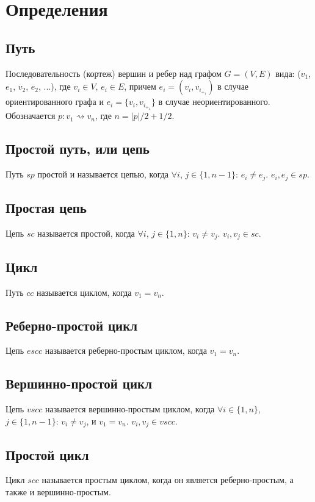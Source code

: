 \documentclass{article}
\begin{document}
\section {Определения}

\subsection{Путь}
Последовательность (кортеж) вершин и ребер над графом \(G = (V, E)\) вида: (\(v_1\), \(e_1\), \(v_2\), \(e_2\), ...), где \(v_i \in V\), \(e_i \in E\), причем \( e_i = (v_i, v_i_+_1)\) в случае ориентированного графа и \(e_i = \{v_i, v_i_+_1\}\) в случае неориентированного. Обозначается \(p: v_1 \rightsquigarrow v_n\), где \(n = |p|/2 + 1/2\).

\subsection{Простой путь, или цепь}
Путь \(sp\) простой и называется цепью, когда \(\forall i\), \(j  \in \{1, n - 1\}\): \(e_i \neq e_j\). \(e_i, e_j \in sp\).

\subsection{Простая цепь}
Цепь \(sc\) называется простой, когда \(\forall i\), \(j \in \{1, n\}\): \(v_i \neq v_j\). \(v_i, v_j \in sc\).

\subsection{Цикл}
Путь \(cc\) называется циклом, когда \(v_1 = v_n\).

\subsection{Реберно-простой цикл}
Цепь \(escc\) называется реберно-простым циклом, когда \(v_1 = v_n\).

\subsection{Вершинно-простой цикл}
Цепь \(vscc\) называется вершинно-простым циклом, когда \(\forall i \in \{1, n\}\), \(j \in \{1, n - 1\}\): \(v_i \neq v_j\), и \(v_1 = v_n\). \(v_i, v_j \in vscc\).

\subsection{Простой цикл}
Цикл \(scc\) называется простым циклом, когда он является реберно-простым, а также и вершинно-простым.
\newpage
\end{document}
